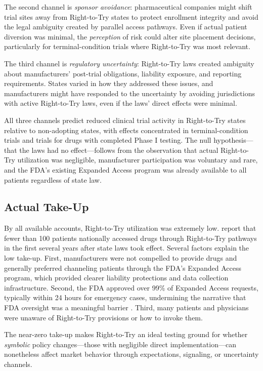 \documentclass[12pt]{article}
\begin{document}
The second channel is \textit{sponsor avoidance}: pharmaceutical companies might shift trial sites away from Right-to-Try states to protect enrollment integrity and avoid the legal ambiguity created by parallel access pathways. Even if actual patient diversion was minimal, the \textit{perception} of risk could alter site placement decisions, particularly for terminal-condition trials where Right-to-Try was most relevant.

The third channel is \textit{regulatory uncertainty}: Right-to-Try laws created ambiguity about manufacturers' post-trial obligations, liability exposure, and reporting requirements. States varied in how they addressed these issues, and manufacturers might have responded to the uncertainty by avoiding jurisdictions with active Right-to-Try laws, even if the laws' direct effects were minimal.

All three channels predict reduced clinical trial activity in Right-to-Try states relative to non-adopting states, with effects concentrated in terminal-condition trials and trials for drugs with completed Phase I testing. The null hypothesis---that the laws had no effect---follows from the observation that actual Right-to-Try utilization was negligible, manufacturer participation was voluntary and rare, and the FDA's existing Expanded Access program was already available to all patients regardless of state law.

\subsection{Actual Take-Up}

By all available accounts, Right-to-Try utilization was extremely low. \citet{frank2019policy} report that fewer than 100 patients nationally accessed drugs through Right-to-Try pathways in the first several years after state laws took effect. Several factors explain the low take-up. First, manufacturers were not compelled to provide drugs and generally preferred channeling patients through the FDA's Expanded Access program, which provided clearer liability protections and data collection infrastructure. Second, the FDA approved over 99\% of Expanded Access requests, typically within 24 hours for emergency cases, undermining the narrative that FDA oversight was a meaningful barrier \citep{darrow2018practical}. Third, many patients and physicians were unaware of Right-to-Try provisions or how to invoke them.

The near-zero take-up makes Right-to-Try an ideal testing ground for whether \textit{symbolic} policy changes---those with negligible direct implementation---can nonetheless affect market behavior through expectations, signaling, or uncertainty channels.
\end{document}
